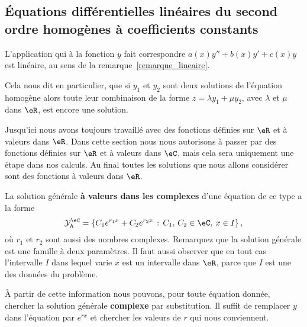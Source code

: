 \subsection{Équations différentielles linéaires du second ordre homogènes à coefficients constants}

\begin{remark}
	L'application qui à la fonction $y$ fait correspondre $a(x)y'' + b(x) y' + c(x)y$ est linéaire, au sens de la remarque~\ref{remarque_lineaire}.

	Cela nous dit en particulier, que si $y_1$ et $y_2$ sont deux solutions de l'équation homogène alors toute leur combinaison de la forme $z = \lambda y_1 + \mu y_2$, avec $\lambda$ et $\mu$ dans $\eR$, est encore une solution.
\end{remark}

\begin{framed}
	Jusqu'ici nous avons toujours travaillé avec des fonctions définies sur $\eR$ et à valeurs dans $\eR$. Dans cette section nous nous autorisons à passer par des fonctions définies sur $\eR$ et à valeurs dans $\eC$, mais cela sera uniquement une étape dans nos calculs. Au final toutes les solutions que nous allons considérer sont des fonctions à valeurs dans $\eR$.
\end{framed}

La solution générale \textbf{à valeurs dans les complexes} d'une équation de ce type a la forme
\begin{equation}\label{sol_gen_ordre_deux_hom}
	\mathcal{Y}_h^\eC  = \left\{C_1 e^{r_1x} +C_2 e^{r_2x} \,:\, C_1,\, C_2 \in \eC, \: x\in I \right\},
\end{equation}
où $r_1$ et $r_2$ sont aussi des nombres complexes. Remarquez que la solution générale est une famille à deux paramètres. Il faut aussi observer que en tout cas l'intervalle $I$ dans lequel varie $x$ est un intervalle dans $\eR$, parce que $I$ est une des données du problème.

À partir de cette information nous pouvons, pour toute équation donnée, chercher la solution générale \textbf{complexe} par substitution. Il suffit de remplacer $y$ dans l'équation par $e^{rx}$ et chercher les valeurs de $r$ qui nous conviennent.


